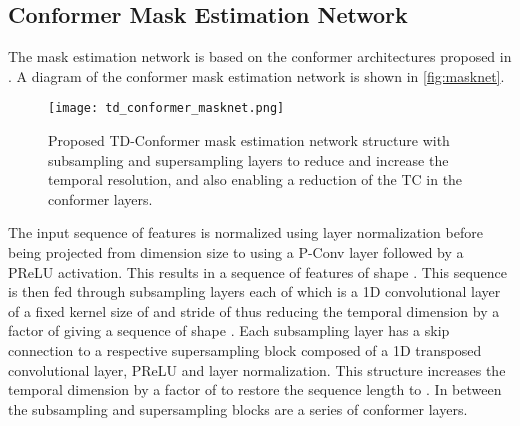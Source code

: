 \subsection{Conformer Mask Estimation Network}
The mask estimation network is based on the conformer architectures proposed in \cite{conformer,se_conformer}. A diagram of the conformer mask estimation network is shown in \autoref{fig:masknet}.
\begin{figure}[!h]
    \centering
    \texttt{[image: td\_conformer\_masknet.png]}
    \caption{Proposed TD-Conformer mask estimation network structure with subsampling and supersampling layers to reduce and increase the temporal resolution, and also enabling a reduction of the \acf{TC} in the conformer layers.
    }
    \label{fig:masknet}
\end{figure}

The input sequence of features  is 
normalized using layer normalization \cite{ba2016layer} before being projected from dimension size  to  using a \ac{P-Conv} layer followed by a \ac{PReLU} activation. This results in a sequence of features of shape . This sequence is then fed through  subsampling layers each of which is a 1D convolutional layer of a fixed kernel size of  and stride of  thus reducing the temporal dimension by a factor of  giving a sequence of shape . Each subsampling layer has a skip connection to a respective supersampling block composed of a 1D transposed convolutional layer, \ac{PReLU} and layer normalization. This structure increases the temporal dimension by a factor of  to restore the sequence length to . In between the subsampling and supersampling blocks are a series of  conformer layers.  

